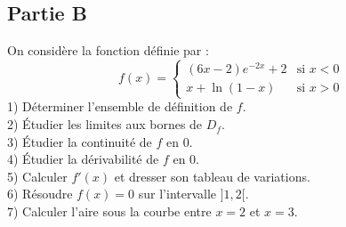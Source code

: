 \documentclass[12pt]{article}
\begin{document}
\subsection*{Partie B}
On considère la fonction définie par :
\[
f(x) = 
\begin{cases}
(6x-2)e^{-2x} + 2 & \text{si } x < 0 \\
x + \ln(1-x) & \text{si } x > 0
\end{cases}
\]
1) Déterminer l'ensemble de définition de \( f \). \\
2) Étudier les limites aux bornes de \( D_f \). \\
3) Étudier la continuité de \( f \) en 0. \\
4) Étudier la dérivabilité de \( f \) en 0. \\
5) Calculer \( f'(x) \) et dresser son tableau de variations. \\
6) Résoudre \( f(x) = 0 \) sur l'intervalle \( ]1,2[ \). \\
7) Calculer l'aire sous la courbe entre \( x=2 \) et \( x=3 \).
\end{document}
